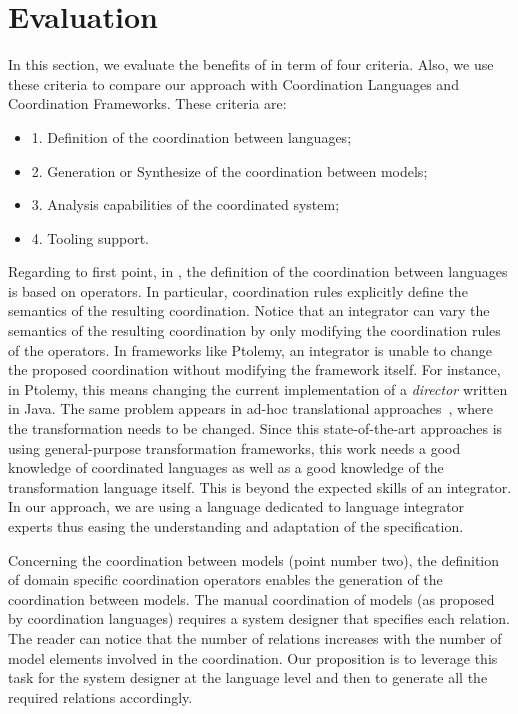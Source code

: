 \section{Evaluation}
\label{sec:evaluation}
In this section, we evaluate the benefits of  \bcool in term of four criteria. Also, we use these criteria to compare our approach with Coordination Languages and Coordination Frameworks. These criteria are:
	\begin{itemize}
		\item 1. Definition of the coordination between languages;
		\item 2. Generation or Synthesize of the coordination between models; 
		\item 3. Analysis capabilities of the coordinated system;
		\item 4. Tooling support.
	\end{itemize}  

Regarding to first point, in \bcool, the definition of the coordination between languages is based on operators. In particular, coordination rules explicitly define the semantics of the resulting coordination. Notice that an integrator can vary the semantics of the resulting coordination by only modifying the coordination rules of the operators. In frameworks like Ptolemy, an integrator is unable to change the proposed coordination without modifying the framework itself. For instance, in Ptolemy, this means changing the current implementation of a \emph{director} written in Java. The same problem appears in ad-hoc translational approaches~\cite{dinatale}, where the transformation needs to be changed. Since this state-of-the-art approaches is using general-purpose transformation frameworks, this work needs a good knowledge of coordinated languages as well as a good knowledge of the transformation language itself. This is beyond the expected skills of an integrator. In our approach, we are using a language dedicated to language integrator experts thus easing the understanding and adaptation of the \bcool specification. 

Concerning the coordination between models (point number two), the definition of domain specific coordination operators enables the generation of the coordination between models. The manual coordination of models (as proposed by coordination languages) requires a system designer that specifies each relation. The reader can notice that the number of relations increases with the number of model elements involved in the coordination. Our proposition is to leverage this task for the system designer at the language level and then to generate all the required relations accordingly.

